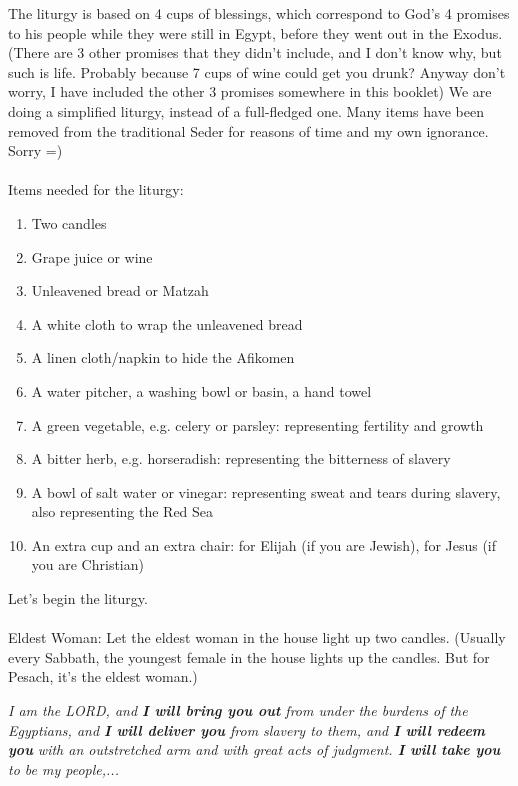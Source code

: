 \documentclass[10pt,oneside,footinclude=true,headinclude=true]{scrbook} %
\newcommand\pagequot[1]{
	\newpage
	\clearscrheadfoot
	\vspace*{\stretch{2}}
	\begin{center}
	\begin{minipage}[c]{8cm}
		#1
	\end{minipage}
	\end{center}
	\vspace*{\stretch{3}}
}
\begin{document}
The liturgy is based on 4 cups of blessings, which correspond to God's 4 promises to his people while they were still in Egypt, before they went out in the Exodus. (There are 3 other promises that they didn't include, and I don't know why, but such is life. Probably because 7 cups of wine could get you drunk? Anyway don't worry, I have included the other 3 promises somewhere in this booklet) We are doing a simplified liturgy, instead of a full-fledged one. Many items have been removed from the traditional Seder for reasons of time and my own ignorance. Sorry =)\\
\\
Items needed for the liturgy:
\begin{enumerate}
	\item{Two candles}
	\item{Grape juice or wine}
	\item{Unleavened bread or Matzah}
	\item{A white cloth to wrap the unleavened bread}
	\item{A linen cloth/napkin to hide the Afikomen}
	\item{A water pitcher, a washing bowl or basin, a hand towel}
	\item{A green vegetable, e.g. celery or parsley: representing fertility and growth}
	\item{A bitter herb, e.g. horseradish: representing the bitterness of slavery}
	\item{A bowl of salt water or vinegar: representing sweat and tears during slavery, also representing the Red Sea}
	\item{An extra cup and an extra chair: for Elijah (if you are Jewish), for Jesus (if you are Christian)}
\end{enumerate}

\vspace{5mm}

\noindent Let's begin the liturgy.\\
\\
\small
Eldest Woman: Let the eldest woman in the house light up two candles. (Usually every Sabbath, the youngest female in the house lights up the candles. But for Pesach, it's the eldest woman.)\\



\normalsize
\pagequot{
\centering
\textit{I am the LORD, and \textbf{I will bring you out} from under the burdens of the Egyptians, and \textbf{I will deliver you} from slavery to them, and \textbf{I will redeem you} with an outstretched arm and with great acts of judgment. \textbf{I will take you} to be my people,...}\\
\bigskip
\spacedlowsmallcaps{Exodus 6:6-8}
}
\end{document}
